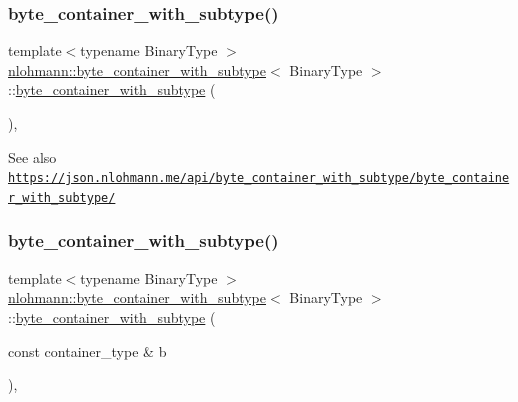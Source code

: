 \subsubsection{\texorpdfstring{byte\+\_\+container\+\_\+with\+\_\+subtype()}{byte\_container\_with\_subtype()}\hspace{0.1cm}{\footnotesize\ttfamily [1/5]}}
{\footnotesize\ttfamily template$<$typename Binary\+Type $>$ \\
\hyperlink{classnlohmann_1_1byte__container__with__subtype}{nlohmann\+::byte\+\_\+container\+\_\+with\+\_\+subtype}$<$ Binary\+Type $>$\+::\hyperlink{classnlohmann_1_1byte__container__with__subtype}{byte\+\_\+container\+\_\+with\+\_\+subtype} (\begin{DoxyParamCaption}{ }\end{DoxyParamCaption})\hspace{0.3cm}{\ttfamily [inline]}, {\ttfamily [noexcept]}}

\begin{DoxySeeAlso}{See also}
\href{https://json.nlohmann.me/api/byte_container_with_subtype/byte_container_with_subtype/}{\tt https\+://json.\+nlohmann.\+me/api/byte\+\_\+container\+\_\+with\+\_\+subtype/byte\+\_\+container\+\_\+with\+\_\+subtype/} 
\end{DoxySeeAlso}
\mbox{\label{classnlohmann_1_1byte__container__with__subtype_a640b6dd55847e86dbb936f97b946170e}} 
\subsubsection{\texorpdfstring{byte\+\_\+container\+\_\+with\+\_\+subtype()}{byte\_container\_with\_subtype()}\hspace{0.1cm}{\footnotesize\ttfamily [2/5]}}
{\footnotesize\ttfamily template$<$typename Binary\+Type $>$ \\
\hyperlink{classnlohmann_1_1byte__container__with__subtype}{nlohmann\+::byte\+\_\+container\+\_\+with\+\_\+subtype}$<$ Binary\+Type $>$\+::\hyperlink{classnlohmann_1_1byte__container__with__subtype}{byte\+\_\+container\+\_\+with\+\_\+subtype} (\begin{DoxyParamCaption}\item[{const container\+\_\+type \&}]{b }\end{DoxyParamCaption})\hspace{0.3cm}{\ttfamily [inline]}, {\ttfamily [noexcept]}}

